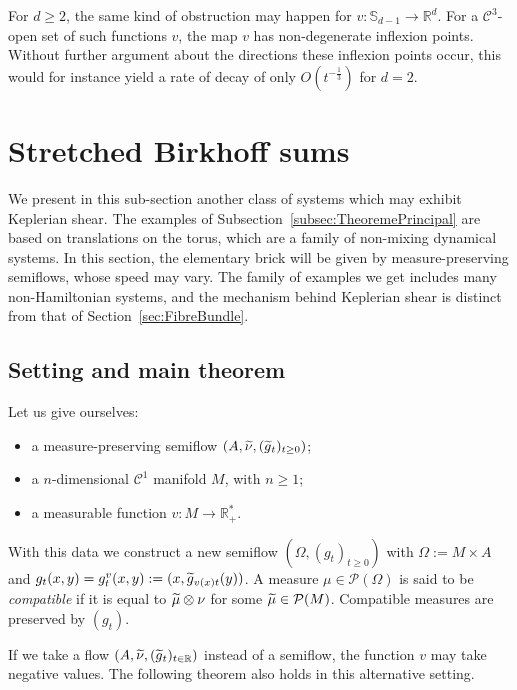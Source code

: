 \documentclass[AHL,Unicode,longabstracts]{cedram}
\newcommand{\R}{\mathbb{R}}
\newcommand{\Sbb}{\mathbb{S}}
\newcommand{\Ccal}{\mathcal{C}}
\newcommand{\Pcal}{\mathcal{P}}
\let\oldtilde\tilde
\renewcommand*{\tilde}[1]{\mathchoice{\widetilde{#1}}{\widetilde{#1}}{\oldtilde{#1}}{\oldtilde{#1}}}\let\oldhat\hat
\renewcommand*{\hat}[1]{\mathchoice{\widehat{#1}}{\widehat{#1}}{\oldhat{#1}}{\oldhat{#1}}}\let\oldforall\forall
\renewcommand*{\forall}{\mathrel{\oldforall}}
\begin{document}
For $d \geq 2$, the same kind of obstruction may happen for $v : \Sbb_{d-1} \to \R^d$. For a $\Ccal^3$-open set of such functions $v$, the map $v$ has non-degenerate inflexion points. Without further argument about the directions these inflexion points occur, this would for instance yield a rate of decay of only $O (t^{-\frac{1}{3}})$ for $d=2$.


\section{Stretched Birkhoff sums}\label{sec:StretchedBirkhoff}

We present in this sub-section another class of systems which may exhibit Keplerian shear. The examples of Subsection~\ref{subsec:TheoremePrincipal} are based on translations on the torus, which are a family of non-mixing dynamical systems. In this section, the elementary brick will be given by measure-preserving semiflows, whose speed may vary. The family of examples we get includes many non-Hamiltonian systems, and the mechanism behind Keplerian shear is distinct from that of Section~\ref{sec:FibreBundle}.


\subsection{Setting and main theorem}\label{subsec:AllongeTheoremePrincipal}

Let us give ourselves:
\begin{itemize}
\item a measure-preserving semiflow $(A, \tilde{\nu}, (\tilde{g}_t)_{t \geq 0})$;
\item a $n$-dimensional $\Ccal^1$ manifold $M$, with $n \geq 1$;
\item a measurable function $v : M \to \R_+^*$.
\end{itemize}
With this data we construct a new semiflow $(\Omega, (g_t)_{t \geq 0})$ with $\Omega := M \times A$ and $g_t (x,y) = g_t^v (x,y) := (x,\tilde{g}_{v(x)t} (y))$. A measure $\mu \in \Pcal (\Omega)$ is said to be \emph{compatible} if it is equal to $\tilde{\mu} \otimes \nu$ for some $\tilde{\mu} \in \Pcal (M)$. Compatible measures are preserved by $(g_t)$.


If we take a flow $(A, \tilde{\nu}, (\tilde{g}_t)_{t \in \R})$ instead of a semiflow, the function $v$ may take negative values. The following theorem also holds in this alternative setting.
\end{document}
